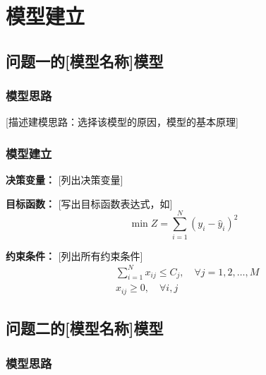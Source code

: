 
\section{模型建立}

\subsection{问题一的[模型名称]模型}

\subsubsection{模型思路}

[描述建模思路：选择该模型的原因，模型的基本原理]

\subsubsection{模型建立}

\textbf{决策变量：} [列出决策变量]

\textbf{目标函数：} [写出目标函数表达式，如]
\begin{equation}\label{eq:obj1}
    \min Z = \sum_{i=1}^{N} (y_i - \hat{y}_i)^2
\end{equation}

\textbf{约束条件：} [列出所有约束条件]
\begin{align}
    &\sum_{i=1}^{N} x_{ij} \leq C_j, \quad \forall j = 1, 2, \ldots, M \label{eq:con1_1}\\
    &x_{ij} \geq 0, \quad \forall i, j \label{eq:con1_2}
\end{align}

\subsection{问题二的[模型名称]模型}

\subsubsection{模型思路}

